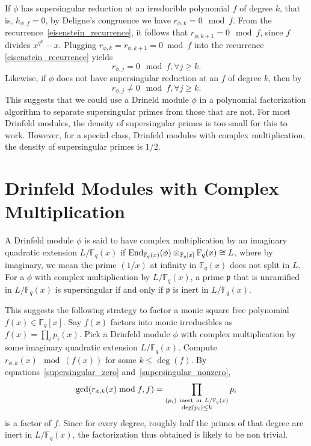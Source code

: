 \documentclass[12pt]{article}
\theoremstyle{plain}
\theoremstyle{definition}
\DeclareMathOperator{\End}{{\rm End}} %
\def\F{\ensuremath{\mathbb{F}}}
\newcommand{\p}{\mathfrak p}
\begin{document}
If $\phi$ has supersingular reduction at an irreducible polynomial $f$ of degree $k$, that
is, $h_{\phi,f}=0$, by Deligne's congruence we have $r_{\phi,k} = 0
\mod f$. From the recurrence~\eqref{eisenstein_recurrence}, it follows
that $r_{\phi,k+1} = 0 \mod f$, since $f$ divides
$x^{q^k}-x$. Plugging $r_{\phi,k} = r_{\phi,k+1} = 0 \bmod f$
into the recurrence \ref{eisenstein_recurrence} yields
\begin{equation}\label{supersingular_zero}
 r_{\phi,j} = 0 \mod f, \forall j \geq k.
\end{equation}
Likewise, if $\phi$ does not have supersingular reduction at an $f$ of
degree $k$, then by~\cite[Lemma~2.3]{cor}
\begin{equation}\label{supersingular_nonzero}
 r_{\phi,j} \neq 0 \mod f, \forall j \geq k.
\end{equation}
This suggests that we could use a Drineld module $\phi$ in a polynomial factorization algorithm to 
separate supersingular primes from those that are not. For most Drinfeld modules, the density of 
supersingular primes is too small for this to work. However, for a special class, Drinfeld modules 
with complex multiplication, the density of supersingular primes is $1/2$. 


\section{Drinfeld Modules with Complex Multiplication}\label{randomized_section}

A Drinfeld module $\phi$ is said to have complex multiplication by an
imaginary quadratic extension $L/\F_q(x)$ if
$\End_{\F_q(x)}(\phi)\otimes_{\F_q[x]} \F_q(x) \cong L$, where by
imaginary, we mean the prime $(1/x)$ at infinity in $\F_q(x)$ does not
split in $L$. For a $\phi$ with complex multiplication by $L/\F_q(x)$,
a prime $\p$ that is unramified in $L/\F_q(x)$ is supersingular if and
only if $\p$ is inert in $L/\F_q(x)$.

This suggests the following strategy to factor a monic square free
polynomial $f(x) \in \F_q[x]$. Say $f(x)$ factors into monic
irreducibles as $f(x) = \prod_i p_i(x)$. Pick a Drinfeld module $\phi$
with complex multiplication by some imaginary quadratic extension
$L/\F_q(x)$. Compute $r_{\phi,k}(x) \mod (f(x))$ for some $k \leq
\deg(f)$. By equations~\eqref{supersingular_zero}
and~\eqref{supersingular_nonzero}, $$\gcd(r_{\phi,k}(x)\bmod f,
f) = \prod_{\substack{(p_i)\  {\rm inert\ in}\ L/\F_q(x)\\ \deg(p_i)\leq k}}p_i$$
is a factor of $f$. Since for every degree, roughly half the primes of
that degree are inert in $L/\F_q(x)$, the factorization thus obtained
is likely to be non trivial.
\end{document}
